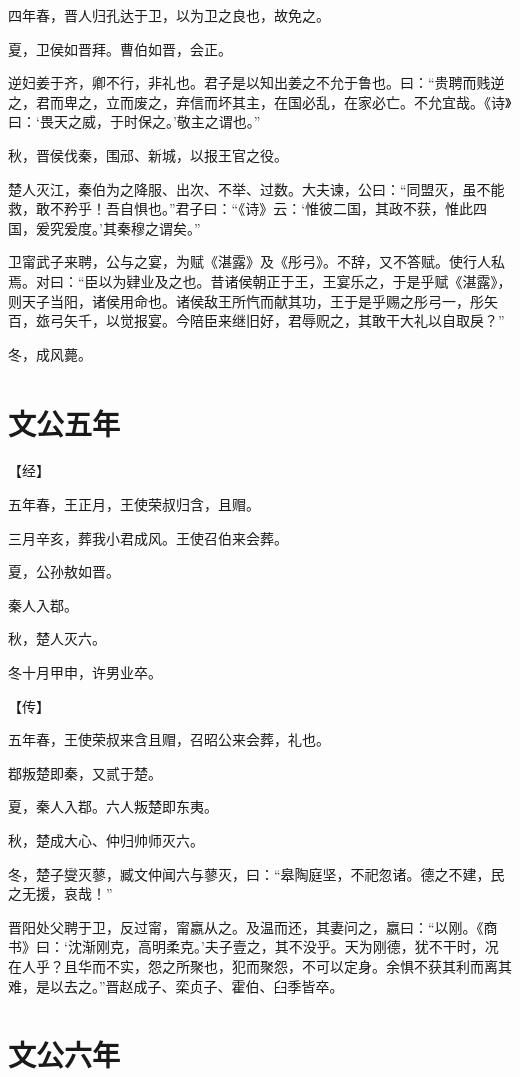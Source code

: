 \documentclass[a4paper,12pt,UTF8,twoside]{ctexbook}
\begin{document}
四年春，晋人归孔达于卫，以为卫之良也，故免之。



夏，卫侯如晋拜。曹伯如晋，会正。

逆妇姜于齐，卿不行，非礼也。君子是以知出姜之不允于鲁也。曰：“贵聘而贱逆之，君而卑之，立而废之，弃信而坏其主，在国必乱，在家必亡。不允宜哉。《诗》曰：‘畏天之威，于时保之。’敬主之谓也。”

秋，晋侯伐秦，围邧、新城，以报王官之役。

楚人灭江，秦伯为之降服、出次、不举、过数。大夫谏，公曰：“同盟灭，虽不能救，敢不矜乎！吾自惧也。”君子曰：“《诗》云：‘惟彼二国，其政不获，惟此四国，爰究爰度。’其秦穆之谓矣。”

卫甯武子来聘，公与之宴，为赋《湛露》及《彤弓》。不辞，又不答赋。使行人私焉。对曰：“臣以为肄业及之也。昔诸侯朝正于王，王宴乐之，于是乎赋《湛露》，则天子当阳，诸侯用命也。诸侯敌王所忾而献其功，王于是乎赐之彤弓一，彤矢百，玈弓矢千，以觉报宴。今陪臣来继旧好，君辱贶之，其敢干大礼以自取戾？”

冬，成风薨。

\section{文公五年}



【经】

五年春，王正月，王使荣叔归含，且赗。

三月辛亥，葬我小君成风。王使召伯来会葬。

夏，公孙敖如晋。

秦人入鄀。

秋，楚人灭六。

冬十月甲申，许男业卒。

【传】

五年春，王使荣叔来含且赗，召昭公来会葬，礼也。

鄀叛楚即秦，又贰于楚。

夏，秦人入鄀。六人叛楚即东夷。

秋，楚成大心、仲归帅师灭六。

冬，楚子燮灭蓼，臧文仲闻六与蓼灭，曰：“皋陶庭坚，不祀忽诸。德之不建，民之无援，哀哉！”

晋阳处父聘于卫，反过甯，甯嬴从之。及温而还，其妻问之，嬴曰：“以刚。《商书》曰：‘沈渐刚克，高明柔克。’夫子壹之，其不没乎。天为刚德，犹不干时，况在人乎？且华而不实，怨之所聚也，犯而聚怨，不可以定身。余惧不获其利而离其难，是以去之。”晋赵成子、栾贞子、霍伯、臼季皆卒。


\section{文公六年}
\end{document}
